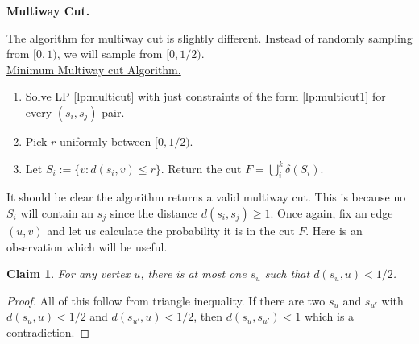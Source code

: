 \documentclass[11pt]{article}
\newtheorem{claim}{Claim}
\begin{document}
\noindent
{\bf Multiway Cut.} 

The algorithm for multiway cut is slightly different. Instead of 
randomly sampling from $[0,1)$, we will sample from $[0,1/2)$.\\

\noindent
\underline{Minimum Multiway cut Algorithm.}
\begin{enumerate}
\item Solve LP \eqref{lp:multicut} with just constraints of the form \eqref{lp:multicut1} for every $(s_i,s_j)$ pair.
\item Pick $r$ uniformly between $[0,1/2)$.
\item Let $S_i := \{v: d(s_i,v) \le r\}$. Return the cut $F = \bigcup_i^k \delta(S_i)$.
\end{enumerate}
\noindent
It should be clear the algorithm returns a valid multiway cut. This is because no $S_i$ will contain an $s_j$
since the distance $d(s_i,s_j) \ge 1$.
Once again, fix an edge $(u,v)$ and let us calculate the probability it is in the cut $F$.
Here is an observation which will be useful.

\begin{claim}\label{claim:mwaycut}
For any vertex $u$, there is at most one $s_u$ such that $d(s_u,u) <1/2$.
\end{claim}
\begin{proof}
All of this follow from triangle inequality. If there are two $s_u$ and $s_{u'}$ with $d(s_u,u) < 1/2$ and $d(s_{u'},u) < 1/2$,
then $d(s_u,s_{u'}) < 1$ which is a contradiction.
\end{proof}
\end{document}

